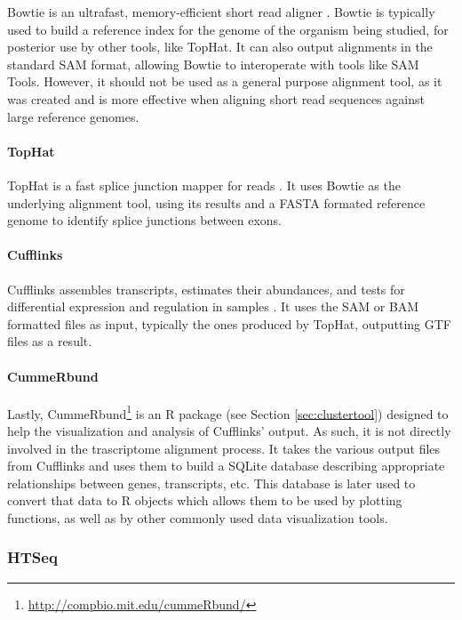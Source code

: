 Bowtie is an ultrafast, memory-efficient short read aligner
\cite{langmead2009ultrafast}. Bowtie is typically used to build a reference
index for the genome of the organism being studied, for posterior use by other
tools, like TopHat. It can also output alignments in the standard SAM format,
allowing Bowtie to interoperate with tools like SAM Tools. However, it should
not be used as a general purpose alignment tool, as it was created and is more
effective when aligning short read sequences against large reference genomes.

\paragraph{TopHat}

TopHat is a fast splice junction mapper for \rnaseq{} reads
\cite{Trapnell01052009}. It uses Bowtie as the underlying alignment tool, using
its results and a FASTA formated reference genome to identify splice junctions
between exons.

\paragraph{Cufflinks}

Cufflinks assembles transcripts, estimates their abundances, and tests for
differential expression and regulation in \rnaseq{} samples
\cite{trapnell2010transcript}. It uses the SAM or BAM formatted files as input,
typically the ones produced by TopHat, outputting GTF files as a result.

\paragraph{CummeRbund}

Lastly, CummeRbund\footnote{\url{http://compbio.mit.edu/cummeRbund/}} is an R
package (see Section \ref{sec:clustertool}) designed to help the visualization and
analysis of Cufflinks' \rnaseq{} output. As such, it is not directly involved in
the trascriptome alignment process. It takes the various output files from
Cufflinks and uses them to build a SQLite database describing appropriate
relationships between genes, transcripts, etc. This database is later used to
convert that data to R objects which allows them to be used by plotting
functions, as well as by other commonly used data visualization tools.

\subsubsection*{HTSeq}

